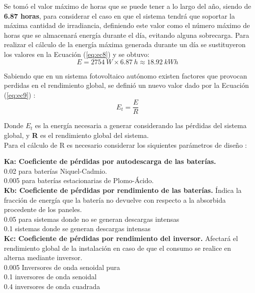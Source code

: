 Se tomó el valor máximo de horas que se puede tener a lo largo del año, siendo de \textbf{6.87 horas}, para considerar el caso en que el sistema tendrá que soportar la máxima cantidad de irradiancia, definiendo este valor como el número máximo de horas que se almacenará energía durante el día, evitando alguna sobrecarga. Para realizar el cálculo de la energía máxima generada durante un día se sustituyeron los valores en la Ecuación (\ref{eq:ec8}) y se obtuvo: 
\begin{equation}\label{eq:ec8sust}
E = 2754 \ W \times 6.87 \ h \approx 18.92 \ kWh   
\end{equation}

Sabiendo que en un sistema fotovoltaico autónomo existen factores que provocan perdidas en el rendimiento global, se definió un nuevo valor dado por la Ecuación (\ref{eq:ec9}) \cite{DDE4}: 
\begin{equation}\label{eq:ec9}
E_{t} = \frac{E}{R}   
\end{equation}

Donde $E_{t}$ es la energía necesaria a generar considerando las pérdidas del sistema global, y \textbf{R} es el rendimiento global del sistema.\\

Para el cálculo de R es necesario considerar los siquientes parámetros de diseño \cite{DDE4}:

\textbf{Ka: Coeficiente de pérdidas por autodescarga de las baterías.}\\
\hspace*{4em} 0.02 para baterías Niquel-Cadmio.\\
\hspace*{4em} 0.005 para baterías estacionarias de Plomo-Ácido.\\

\textbf{Kb: Coeficiente de pérdidas por rendimiento de las baterías.} Índica la fracción de energía que la batería no devuelve con respecto a la absorbida procedente de los paneles. \\
\hspace*{4em}0.05 para sistemas donde no se generan descargas intensas \\
\hspace*{4em}0.1 sistemas donde se generan descargas intensas\\

\textbf{Kc: Coeficiente de pérdidas por rendimiento del inversor.} Afectará el rendimiento global de la instalación en caso de que el consumo se realice en alterna mediante inversor. \\
\hspace*{4em}0.005 Inversores de onda senoidal pura\\
\hspace*{4em}0.1 inversores de onda senoidal\\
\hspace*{4em}0.4 inversores de onda cuadrada\\

